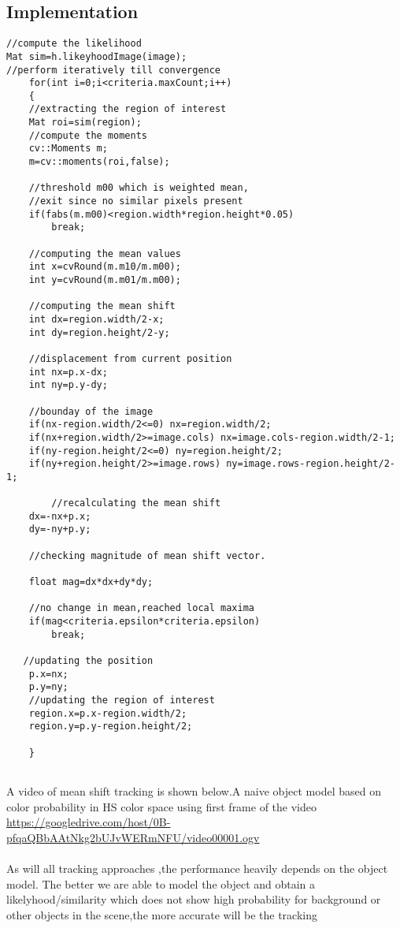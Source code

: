 \documentclass[fontsize=12pt, %
                             paper=a4, %
                             oneside, %
                             captions=tableheading,
                             index=totoc,
                             hyperref]{labbook}
\newcommand{\vurl}[1]{\url{#1}}
\begin{document}
\subsection{Implementation}
\begin{verbatim}
//compute the likelihood
Mat sim=h.likeyhoodImage(image);
//perform iteratively till convergence
    for(int i=0;i<criteria.maxCount;i++)
    {
    //extracting the region of interest
    Mat roi=sim(region);
    //compute the moments
    cv::Moments m;
    m=cv::moments(roi,false);
    
    //threshold m00 which is weighted mean,
    //exit since no similar pixels present
    if(fabs(m.m00)<region.width*region.height*0.05)
        break;

    //computing the mean values
    int x=cvRound(m.m10/m.m00);
    int y=cvRound(m.m01/m.m00);
        
    //computing the mean shift
    int dx=region.width/2-x;
    int dy=region.height/2-y;

    //displacement from current position
    int nx=p.x-dx;
    int ny=p.y-dy;

    //bounday of the image
    if(nx-region.width/2<=0) nx=region.width/2;
    if(nx+region.width/2>=image.cols) nx=image.cols-region.width/2-1;
    if(ny-region.height/2<=0) ny=region.height/2;
    if(ny+region.height/2>=image.rows) ny=image.rows-region.height/2-1;

        //recalculating the mean shift
    dx=-nx+p.x;
    dy=-ny+p.y;

    //checking magnitude of mean shift vector.

    float mag=dx*dx+dy*dy;

    //no change in mean,reached local maxima
    if(mag<criteria.epsilon*criteria.epsilon)
        break;

   //updating the position
    p.x=nx;
    p.y=ny;
    //updating the region of interest
    region.x=p.x-region.width/2;
    region.y=p.y-region.height/2;

    }
     
\end{verbatim}
A video of mean shift tracking is shown below.A naive object model based
on color probability in HS color space using first frame of the video
\vurl{https://googledrive.com/host/0B-pfqaQBbAAtNkg2bUJvWERmNFU/video00001.ogv}
\\\\
As will all tracking approaches ,the performance heavily depends on the object model.
The better we are able to model the object and obtain a likelyhood/similarity which
does not show high probability for background or other objects in the scene,the more 
accurate will be the tracking
\end{document}
